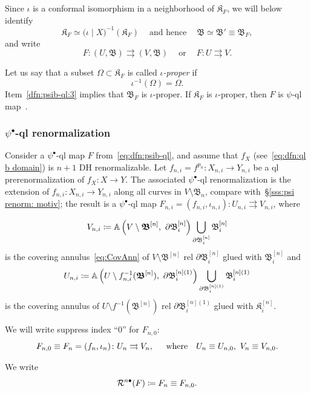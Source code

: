 \documentclass{amsart}
\newcommand{\filled}{{\mathfrak K }}
\newcommand{\bush}{{\mathfrak B }}
\newcommand{\bbush}{{\boldsymbol {\mathfrak B} }}
\renewcommand{\sp}{{\ \ }}
\newcommand{\1}{{\mathbb 1 }}
\begin{document}
 
Since $\iota$ is a conformal isomorphism in a neighborhood of $\filled_F$, we will below identify 
\[\filled_F\simeq \big(\iota\mid X\big)^{-1}(\filled_F)\sp\sp \text{ and hence }\sp\sp\bush\simeq \bush'\equiv \bush_F,\]
 and write  \[F\colon ( U, \bush)  \rightrightarrows (V, \bush) \sp\sp\text{ or }\sp\sp F\colon U \rightrightarrows V.\] 
 
  
Let us say that a subset $\Omega\subset \filled_F$ is called \emph{$\iota$-proper} if
\[\iota^{-1}(\Omega)=\Omega.\] 
Item~\ref{dfn:psib-ql:3} implies that $\bush_F$ is $\iota$-proper. If $\filled_F$ is $\iota$-proper, then $F$ is $\psi$-ql map~\cite{K}. 

\subsubsection{$\psi^\bullet$-ql renormalization}\label{sss:psi b renorm} Consider a $\psi^\bullet$-ql map $F$ from~\eqref{eq:dfn:psib-ql}, and assume that $f_X$ (see~\eqref{eq:dfn:ql b domain}) is $n+1$ DH renormalizable. Let $f_{n,i}=f^{p_n}\colon X_{n,i}\to Y_{n,i}$ be a ql prerenormalization of $f_X\colon X\to Y$. The associated $\psi^\bullet$-ql renormalization is the extension of  $f_{n,i}\colon X_{n,i} \to Y_{n,i}$ along all curves in $V\setminus \bbush_n$, compare with~\S\ref{sss:psi renorm: motiv}; the result is a $\psi^\bullet$-ql map $F_{n,i}=(f_{n,i},\iota_{n,i})\colon U_{n,i}\rightrightarrows V_{n,i}$, where

\[V_{n,i}\coloneqq \A\left(V\setminus \bbush^{[n]}, \ \partial \bush^{[n]}_i\right) \bigcup _{\partial \bush^{[n]}_i} \bush^{[n]}_i\] is the covering annulus~\eqref{eq:CovAnn} of $V\setminus \bbush^{[n]}$ rel $\partial \bush^{[n]}_i$ glued with $\bush^{[n]}_i$ and 
\[U_{n,i}\coloneqq \A\left( U\setminus f_{n,i}^{-1}(\bbush^{[n]}), \ \partial \bush^{[n](1)}_i\right) \bigcup _{\partial \bush^{[n](1)}_i} \bush^{[n](1)}_i\] 
is the covering annulus of $U\setminus f^{-1}(\bbush^{[n]})$ rel $\partial \bush^{[n](1)}_i$ glued with $\filled^{[n]}_i$.

We will write suppress index ``$0$'' for $F_{n,0}$:
\[F_{n,0}\equiv F_{n}=(f_{n},\iota_{n})\colon U_{n}\rightrightarrows V_{n}, \hspace{0.4cm}\text{ where } \sp U_n\equiv U_{n,0},\ V_n\equiv V_{n,0}.\]

We write
\begin{equation}
\label{RR bullet f}
{\mathcal R}^{n\bullet }( F) \coloneqq F_n \equiv F_{n,0}.
\end{equation}
\end{document}
